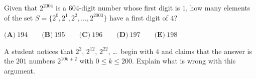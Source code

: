 Given that $2^{2004}$ is a $604$-digit number whose first digit is $1$, how many elements of the set $S=\{2^0,2^1,2^2,\ldots,2^{2003}\}$ have a first digit of $4$?

$\textbf{(A)}\ 194\qquad\textbf{(B)}\ 195\qquad\textbf{(C)}\ 196\qquad\textbf{(D)}\ 197\qquad\textbf{(E)}\ 198$

A student notices that $2^2$, $2^{12}$, $2^{22}$, \ldots\ begin with $4$ and claims that the answer is the $201$ numbers $2^{10k+2}$ with $0\le k\le200$. Explain what is wrong with this argument.

